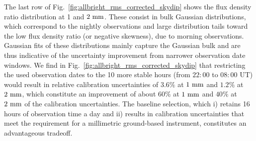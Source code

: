 The last row of
Fig.~\ref{fig:allbright_rms_corrected_skydip} shows the flux density
ratio distribution at 1 and $2~\rm{mm}$. These consist in bulk Gaussian
distributions, which correspond to the nightly observations and large
distribution tails toward the low flux density ratio (or negative
skewness), due to morning
observations. Gaussian fits of these distributions mainly capture the
Gaussian bulk and are thus indicative of the uncertainty improvement
from narrower observation date windows. We find in
Fig.~\ref{fig:allbright_rms_corrected_skydip} that restricting the
used observation dates to the 10 more stable hours (from $22:00$ to
$08:00$ UT) would result in relative calibration uncertainties of
$3.6\%$ at $1~\rm{mm}$ and $1.2\%$ at $2~\rm{mm}$, which constitute an
improvement of about $60\%$ at $1~\rm{mm}$ and $40\%$ at
$2~\rm{mm}$ of the calibration uncertainties.  
The baseline selection, which i) retains 16 hours of observation time
a day and ii) results in calibration uncertainties that meet the
requirement for a millimetric ground-based instrument, constitutes an
advantageous tradeoff.  



